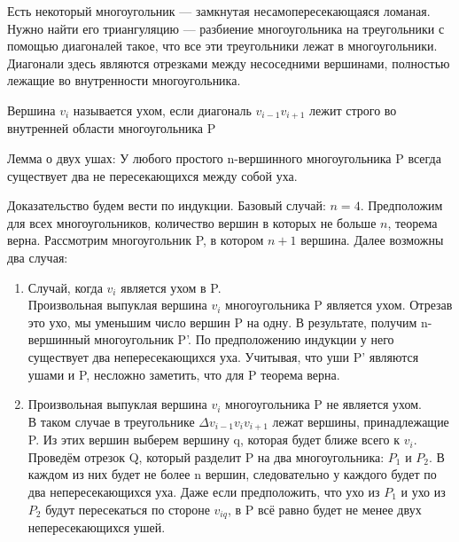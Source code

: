 Есть некоторый многоугольник — замкнутая несамопересекающаяся ломаная. Нужно найти его триангуляцию — разбиение многоугольника на треугольники с помощью диагоналей такое, что все эти треугольники лежат в многоугольники. Диагонали здесь являются отрезками между несоседними вершинами, полностью лежащие во внутренности многоугольника.

Вершина $v_i$ называется ухом, если диагональ $v_{i-1}v_{i+1}$ лежит строго во внутренней области многоугольника P

Лемма о двух ушах: У любого простого n-вершинного многоугольника P всегда существует два не пересекающихся между собой уха.

Доказательство будем вести по индукции. Базовый случай: $n=4$. Предположим для всех многоугольников, количество вершин в которых не больше $n$, теорема верна. Рассмотрим многоугольник P, в котором $n+1$ вершина. Далее возможны два случая:
\begin{enumerate}
    \item Случай, когда $v_i$ является ухом в P. \\
    Произвольная выпуклая вершина $v_i$ многоугольника P является ухом. Отрезав это ухо, мы уменьшим число вершин P на одну. В результате, получим n-вершинный многоугольник P'. По предположению индукции у него существует два непересекающихся уха. Учитывая, что уши P' являются ушами и P, несложно заметить, что для P теорема верна.
    \item Произвольная выпуклая вершина $v_i$ многоугольника P не является ухом. \\
    В таком случае в треугольнике $\Delta v_{i-1}v_iv_{i+1}$ лежат вершины, принадлежащие P. Из этих вершин выберем вершину q, которая будет ближе всего к $v_i$. Проведём отрезок Q, который разделит P на два многоугольника: $P_1$ и $P_2$. В каждом из них будет не более n вершин, следовательно у каждого будет по два непересекающихся уха. Даже если предположить, что ухо из $P_1$ и ухо из $P_2$ будут пересекаться по стороне $v_{iq}$, в P всё равно будет не менее двух непересекающихся ушей.
\end{enumerate}